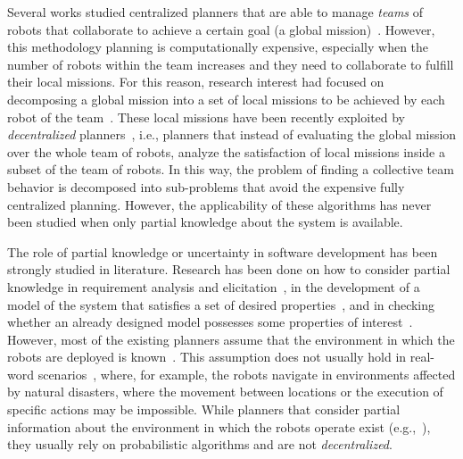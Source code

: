 Several works studied centralized planners that are able to manage \emph{teams} of robots that collaborate to achieve a certain goal (a global mission)~\cite{kloetzer2011multi,quottrup2004multi}.
However, this methodology planning is computationally expensive, especially when the number of robots within the team increases %
and they need to collaborate to fulfill their local missions.
For this reason, research interest had focused on decomposing a global mission into a set of local missions to be achieved by each robot of the team~\cite{schillinger2016decomposition,guo2015multi,tumova2016multi}. 
These local missions have been recently exploited by \emph{decentralized} planners~\cite{tumova2016multi}, i.e., planners that instead of evaluating the global mission over the whole team of robots, analyze the satisfaction of local missions inside a subset of the team of robots. 
In this way, the problem of finding a collective team behavior is decomposed into sub-problems that avoid the expensive fully centralized planning. 
However, the applicability of these algorithms has never been studied when only partial knowledge about the system is available.



The role of partial knowledge or uncertainty  in software development has been strongly studied in literature.
Research has been done on how to consider partial knowledge in requirement analysis and elicitation~\cite{menghi2017integrating,menghi2017cover,letier2008deriving}, in the development of a model of the system that satisfies a set of desired properties~\cite{uchitel2009synthesis,uchitel2013supporting,famelis2012partial,albarghouthi2012under,Bernasconi2017}, and in checking   whether an  already designed model possesses some properties of interest~\cite{menghi2016dealing,bruns1999model,chechik2004multi}.
However, most of the existing planners assume that the environment in which the robots are deployed is known~\cite{7139412}. 
This assumption does not usually hold in real-word scenarios~\cite{lahijanian2016iterative},  where, for example,  the robots navigate in environments affected by natural disasters, where the movement between locations or the execution of specific actions may be impossible. %
While planners that consider partial information about the environment in which the robots operate exist (e.g.,~\cite{roy2006planning,du2012robot,diaz2001exploring}), they usually rely on probabilistic algorithms and are not \emph{decentralized}.

